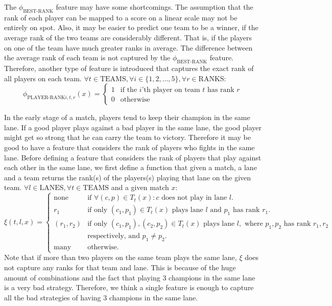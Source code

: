 The $\phi_\text{BEST-RANK}$ feature may have some shortcomings. The assumption that the rank of each player can be mapped to a score on a linear scale may not be entirely on spot.
Also, it may be easier to predict one team to be a winner, if the average rank of the two teams are considerably different. That is, if the players on one of the team have much greater ranks in average. The difference between the average rank of each team is not captured by the $\phi_\text{BEST-RANK}$ feature.
Therefore, another type of feature is introduced that captures the exact rank of all players on each team.
$\forall t \in \text{TEAMS}, \forall i \in \{1,2,\dots,5\}, \forall r \in \text{RANKS}$:
\begin{equation}\label{eq:playerrank}
\phi_{\text{PLAYER-RANK}i,t,r}(x) = 
\begin{cases} 
  1 & \text{if the } i \text{'th player on team } t \text{ has rank } r\\
  0 & \text{otherwise} 
\end{cases}  
\end{equation}

In the early stage of a match, players tend to keep their champion in the same lane.
If a good player plays against a bad player in the same lane, the good player might get so strong that he can carry the team to victory.
Therefore it may be good to have a feature that considers the rank of players who fights in the same lane.
Before defining a feature that considers the rank of players that play against each other in the same lane,
we first define a function that given a match, a lane and a team returns the rank(s) of the players(s) playing that lane on the given team.
$\forall l \in \text{LANES}, \forall t \in \text{TEAMS}$ and a given match $x$:
\begin{equation}\label{eq:xi}
  \xi(t,l,x) =
\begin{cases} 
  \text{none} & \text{if } \forall(c, p) \in T_t(x): c \text{ does not play in lane } l. \\
  r_1 & \text{if only } (c_1, p_1) \in T_t(x) \text{ plays lane } l \text{ and } p_1 \text{ has rank } r_1 \text{.}\\
  (r_1, r_2) & \text{if only } (c_1, p_1), (c_2, p_2) \in T_t(x) \text{ plays lane } l, \text{ where } p_1, p_2 \text{ has rank } r_1, r_2\\ 
&\text{respectively, and } p_1 \neq p_2.\\
  \text{many} & \text{otherwise}.
\end{cases}
\end{equation}
Note that if more than two players on the same team plays the same lane, $\xi$ does not capture any ranks for that team and lane. This is because of the huge amount of combinations and the fact that playing 3 champions in the same lane is a very bad strategy. Therefore, we think a single feature is enough to capture all the bad strategies of having 3 champions in the same lane.
 
